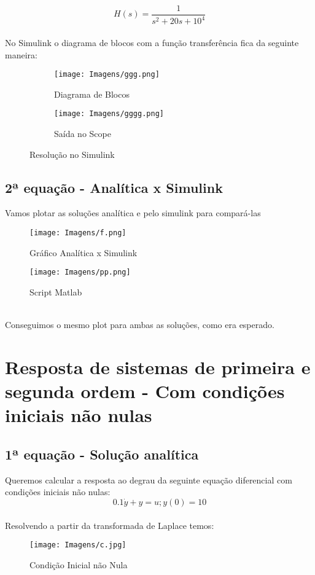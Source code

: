 \documentclass[a4paper, 12pt]{article}
\begin{document}
	\begin{equation}
		H(s) = \frac{1}{s^2 + 20s + 10^4}
	\end{equation}
	\\No Simulink o diagrama de blocos com a função transferência fica da seguinte maneira:
	
	\begin{figure}[h]
	\centering
		\begin{subfigure}{.5\textwidth}
  			\centering
 			\texttt{[image: Imagens/ggg.png]}
  			\caption{Diagrama de Blocos}
		\end{subfigure}%
		\begin{subfigure}{.5\textwidth}
  			\centering
  			\texttt{[image: Imagens/gggg.png]}
  			\caption{Saída no Scope}
		\end{subfigure}
			\caption{Resolução no Simulink}
	\end{figure}
\newpage
\subsection{2ª equação - Analítica x Simulink}
	Vamos plotar as soluções analítica e pelo simulink para compará-las
	\begin{figure}[h]
		\centering
		\texttt{[image: Imagens/f.png]}
		\caption{Gráfico Analítica x Simulink}
	\end{figure}
	\begin{figure}[h]
		\centering
		\texttt{[image: Imagens/pp.png]}
		\caption{Script Matlab}
	\end{figure}
	\\Conseguimos o mesmo plot para ambas as soluções, como era esperado.
	



\newpage
\section{Resposta de sistemas de primeira e segunda ordem - Com condições iniciais não nulas}

\subsection{1ª equação - Solução analítica}
Queremos calcular a resposta ao degrau da seguinte equação diferencial com condições iniciais não nulas:
	\begin{equation}
		0.1\dot{y} + y = u; y(0) = 10
	\end{equation}
	\\Resolvendo a partir da transformada de Laplace temos:
	\begin{figure}[h]
		\centering
		\texttt{[image: Imagens/c.jpg]}
		\caption{Condição Inicial não Nula}
	\end{figure}
		
\end{document}
